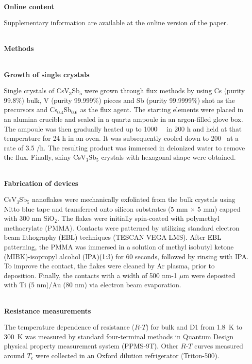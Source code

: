 \documentclass[article,reprint,amsmath,amssymb,superscriptaddress,longbibliography]{revtex4-1}
\begin{document}
~\\
\noindent\textbf{Online content}

\noindent Supplementary information are available at the online version of the paper. 


~\\

%
%






\clearpage
\noindent\textbf{Methods}

~\\
\noindent
\textbf{Growth of single crystals}

\noindent
Single crystals of CsV$_3$Sb$_5$ were grown through flux methods by using Cs (purity 99.8\%) bulk, V (purity 99.999\%) pieces and Sb (purity 99.9999\%) shot as the precursors and Cs$_{0.4}$Sb$_{0.6}$ as the flux agent. The starting elements were placed in an alumina crucible and sealed in a quartz ampoule in an argon-filled glove box.  The ampoule was then gradually heated up to 1000~\textcelsius ~ in 200 h and held at that temperature for 24 h in an oven. It was subsequently cooled down to 200 \textcelsius~at a rate of 3.5 \textcelsius/h. The resulting product was immersed in deionized water to remove the flux. Finally, shiny CsV$_3$Sb$_5$ crystals with hexagonal shape were obtained.


~\\
\textbf{Fabrication of devices}

\noindent
CsV$_3$Sb$_5$ nanoflakes were mechanically exfoliated from the bulk crystals using Nitto blue tape and transferred onto silicon substrates (5 mm $\times$ 5 mm) capped with 300 nm SiO$_2$. The flakes were initially spin-coated with polymethyl methacrylate (PMMA). Contacts were patterned by utilizing standard electron beam lithography (EBL) techniques (TESCAN VEGA LMS). After EBL patterning, the PMMA was immersed in a solution of methyl isobutyl ketone (MIBK)-isopropyl alcohol (IPA)(1:3) for 60 seconds, followed by rinsing with IPA. To improve the contact, the flakes were cleaned by Ar plasma, prior to deposition. Finally, the contacts with a width of 500 nm-1 $\mu$m were deposited with Ti (5 nm)/Au (80 nm) via electron beam evaporation.



~\\
\textbf{Resistance measurements}

\noindent
The temperature dependence of resistance ($R$-$T$) for bulk and D1 from 1.8~K to 300~K was measured by standard four-terminal methods in Quantum Design physical property measurement system (PPMS-9T). Other $R$-$T$ curves measured around $T_\textrm{c}$ were collected in an Oxford dilution refrigerator (Triton-500).
\end{document}
